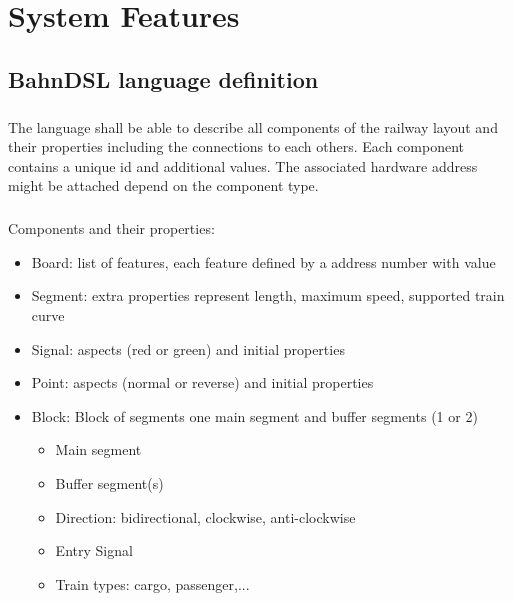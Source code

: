 \documentclass[a4paper,11pt]{scrreprt}
\begin{document}


\chapter{System Features}

\section{BahnDSL language definition}

\paragraph{}The language shall be able to describe all components of the railway layout and their properties including the connections to each others. Each component contains a unique id and additional values. The associated hardware address might be attached depend on the component type.

\paragraph{}Components and their properties:
\begin{itemize}
    \item Board: list of features, each feature defined by a address number with value
    \item Segment: extra properties represent length, maximum speed, supported train curve
    \item Signal: aspects (red or green) and initial properties
    \item Point: aspects (normal or reverse) and initial properties
    \item Block: Block of segments one main segment and buffer segments (1 or 2)
    \begin{itemize}
        \item Main segment
        \item Buffer segment(s)
        \item Direction: bidirectional, clockwise, anti-clockwise
        \item Entry Signal
        \item Train types: cargo, passenger,...
    \end{itemize}
\end{itemize}
\end{document}
